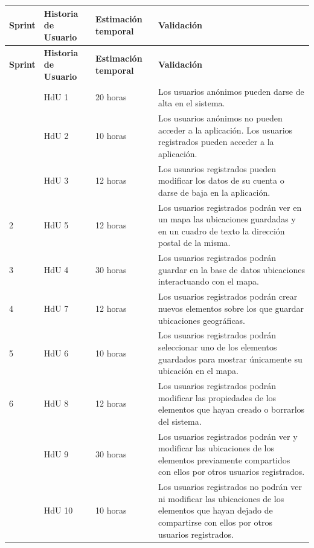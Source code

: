\begin{longtable}{p{1cm} p{4cm} p{4cm} p{6cm}}
  	\hline  	    
  	\multicolumn{1}{p{1cm}}{\cellcolor{black!30}\textbf{Sprint}} &
    \multicolumn{1}{p{4cm}}{\cellcolor{black!30}\textbf{Historia de Usuario}} & 
 	\multicolumn{1}{p{4cm}}{\cellcolor{black!30}\textbf{Estimación temporal}} &
 	\multicolumn{1}{p{6cm}}{\cellcolor{black!30}\textbf{Validación}}
 	\\
 	\toprule 
   	\endfirsthead
	     
    \hline
  	\multicolumn{1}{p{1cm}}{\cellcolor{black!30}\textbf{Sprint}} &
    \multicolumn{1}{p{4cm}}{\cellcolor{black!30}\textbf{Historia de Usuario}} & 
 	\multicolumn{1}{p{4cm}}{\cellcolor{black!30}\textbf{Estimación temporal}} &
 	\multicolumn{1}{p{6cm}}{\cellcolor{black!30}\textbf{Validación}}
 	\\	 
 	\toprule
 	\endhead

	\rowcolor{gray!25}
	\multirow{3}{*}{1}	& HdU 1	&	20 horas	&	Los usuarios anónimos pueden darse de alta en el sistema. \\ 
	\rowcolor{gray!25}	& HdU 2	&	10 horas	&	Los usuarios anónimos no pueden acceder a la aplicación. Los usuarios registrados 														pueden acceder a la aplicación. \\ 
	\rowcolor{gray!25}	& HdU 3	&	12 horas	&	Los usuarios registrados pueden modificar los datos de su cuenta o darse de baja en 														la aplicación.  \\                      
	
	2	& HdU 5		&	12 horas	&	Los usuarios registrados podrán ver en un mapa las ubicaciones guardadas y en un cuadro de 												texto la dirección postal de la misma.\\
	\rowcolor{gray!25}
	3	& HdU 4		&	30 horas	&	Los usuarios registrados podrán guardar en la base de datos ubicaciones 																	interactuando con el mapa. \\
	
	4	& HdU 7		&	12 horas	&	Los usuarios registrados podrán crear nuevos elementos sobre los que guardar ubicaciones 													geográficas. \\
	\rowcolor{gray!25}
	5	& HdU 6		&	10 horas	&	Los usuarios registrados podrán seleccionar uno de los elementos 																			guardados para mostrar únicamente su ubicación en el mapa. \\

	6	& HdU 8		&	12 horas	&	Los usuarios registrados podrán modificar las propiedades de los elementos que hayan creado o 											borrarlos del sistema. \\
	\rowcolor{gray!25}
	\multirow{2}{*}{7}	& HdU 9		&	30 horas	&	Los usuarios registrados podrán ver y modificar las ubicaciones de los elementos 															previamente compartidos con ellos por otros usuarios registrados. \\
	\rowcolor{gray!25}	& HdU 10	&	10 horas	&	Los usuarios registrados no podrán ver ni modificar las ubicaciones de los 																elementos que hayan dejado de compartirse con ellos por otros usuarios 																	registrados. \\


\end{longtable}
